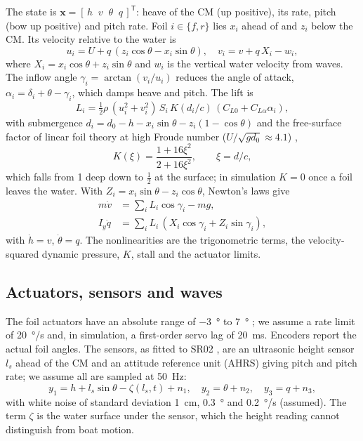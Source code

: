 \documentclass[conference]{IEEEtran}
\newcommand{\T}{^{\mathsf T}}
\newcommand{\half}{\tfrac{1}{2}}
\begin{document}
The state is $\bm x=[\,h\;\;v\;\;\theta\;\;q\,]\T$: heave of the CM (up
positive), its rate, pitch (bow up positive) and pitch rate. Foil
$i\in\{f,r\}$ lies $x_i$ ahead of and $z_i$ below the CM. Its velocity relative
to the water is
\begin{equation}
u_i=U+q\,(z_i\cos\theta-x_i\sin\theta),\quad
v_i=v+q\,X_i-w_i,
\label{eq:vfoil}
\end{equation}
where $X_i=x_i\cos\theta+z_i\sin\theta$ and $w_i$ is the vertical water
velocity from waves. The inflow angle $\gamma_i=\arctan(v_i/u_i)$ reduces the
angle of attack, $\alpha_i=\delta_i+\theta-\gamma_i$, which damps heave and
pitch. The lift is
\begin{equation}
L_i=\half\rho\,(u_i^2+v_i^2)\,S_i\,K(d_i/c)\,(C_{L0}+C_{L\alpha}\alpha_i),
\label{eq:lift}
\end{equation}
with submergence $d_i=d_0-h-x_i\sin\theta-z_i(1-\cos\theta)$ and the
free-surface factor of linear foil theory at high Froude number
($U/\sqrt{gd_0}\approx4.1$) \cite{faltinsen},
\begin{equation}
K(\xi)=\frac{1+16\xi^2}{2+16\xi^2},\qquad \xi=d/c ,
\label{eq:K}
\end{equation}
which falls from 1 deep down to $\half$ at the surface; in simulation $K=0$ once
a foil leaves the water. With $Z_i=x_i\sin\theta-z_i\cos\theta$, Newton's laws
give
\begin{align}
m\dot v &= \textstyle\sum_i L_i\cos\gamma_i-mg, \label{eq:heave}\\
I_y\dot q &= \textstyle\sum_i L_i\,(X_i\cos\gamma_i+Z_i\sin\gamma_i),
\label{eq:pitch}
\end{align}
with $\dot h=v$, $\dot\theta=q$. The nonlinearities are the trigonometric
terms, the velocity-squared dynamic pressure, $K$, stall and the actuator
limits.

\subsection{Actuators, sensors and waves}

The foil actuators have an absolute range of \SI{-3}{\degree} to
\SI{7}{\degree} \cite{belime}; we assume a rate limit of \SI{20}{\degree/s} and,
in simulation, a first-order servo lag of \SI{20}{ms}. Encoders report the
actual foil angles. The sensors, as fitted to SR02 \cite{belime}, are an
ultrasonic height sensor $l_s$ ahead of the CM and an attitude reference unit
(AHRS) giving pitch and pitch rate; we assume all are sampled at \SI{50}{Hz}:
\begin{equation}
y_1=h+l_s\sin\theta-\zeta(l_s,t)+n_1,\quad y_2=\theta+n_2,\quad y_3=q+n_3,
\label{eq:meas}
\end{equation}
with white noise of standard deviation \SI{1}{cm}, \SI{0.3}{\degree} and
\SI{0.2}{\degree/s} (assumed). The term $\zeta$ is the water surface under the
sensor, which the height reading cannot distinguish from boat motion.
\end{document}
